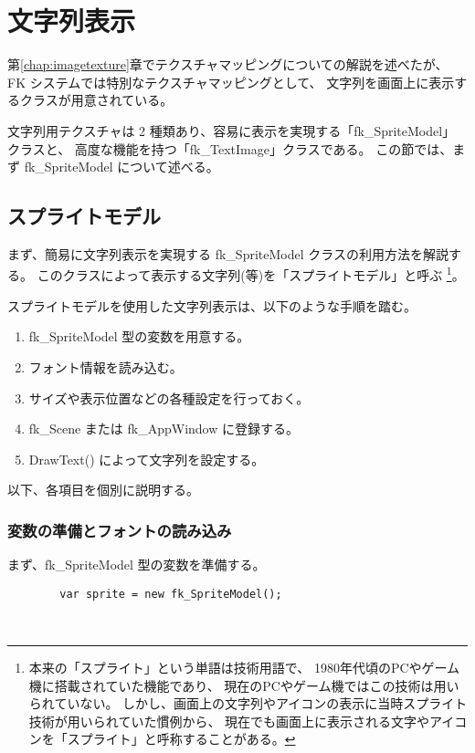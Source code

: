 \chapter{文字列表示} \label{chap:stringimage}
第\ref{chap:imagetexture}章でテクスチャマッピングについての解説を述べたが、
FK システムでは特別なテクスチャマッピングとして、
文字列を画面上に表示するクラスが用意されている。

文字列用テクスチャは 2 種類あり、容易に表示を実現する「fk\_SpriteModel」クラスと、
高度な機能を持つ「fk\_TextImage」クラスである。
この節では、まず fk\_SpriteModel について述べる。

\section{スプライトモデル} \label{sec:spritemodel}
まず、簡易に文字列表示を実現する fk\_SpriteModel クラスの利用方法を解説する。
このクラスによって表示する文字列(等)を「スプライトモデル」と呼ぶ
\footnote{本来の「スプライト」という単語は技術用語で、
1980年代頃のPCやゲーム機に搭載されていた機能であり、
現在のPCやゲーム機ではこの技術は用いられていない。
しかし、画面上の文字列やアイコンの表示に当時スプライト技術が用いられていた慣例から、
現在でも画面上に表示される文字やアイコンを「スプライト」と呼称することがある。}。

スプライトモデルを使用した文字列表示は、以下のような手順を踏む。
\begin{enumerate}
 \item fk\_SpriteModel 型の変数を用意する。
 \item フォント情報を読み込む。
 \item サイズや表示位置などの各種設定を行っておく。
 \item fk\_Scene または fk\_AppWindow に登録する。
 \item DrawText() によって文字列を設定する。
\end{enumerate}

以下、各項目を個別に説明する。

\subsection{変数の準備とフォントの読み込み} \label{subsec:initFont}
まず、fk\_SpriteModel 型の変数を準備する。
\\
\begin{screen}
\begin{verbatim}
        var sprite = new fk_SpriteModel();
\end{verbatim}
\end{screen}
~

